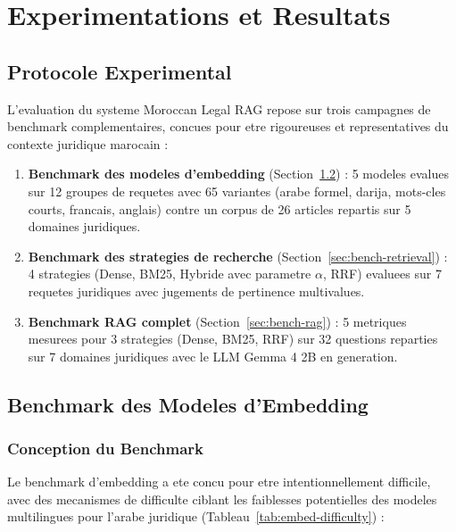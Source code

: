 \chapter{Experimentations et Resultats}
\label{chap:experimentations}

\section{Protocole Experimental}

L'evaluation du systeme Moroccan Legal RAG repose sur trois campagnes de benchmark complementaires, concues pour etre rigoureuses et representatives du contexte juridique marocain :

\begin{enumerate}
    \item \textbf{Benchmark des modeles d'embedding} (Section~\ref{sec:bench-embedding}) : 5 modeles evalues sur 12 groupes de requetes avec 65 variantes (arabe formel, darija, mots-cles courts, francais, anglais) contre un corpus de 26 articles repartis sur 5 domaines juridiques.

    \item \textbf{Benchmark des strategies de recherche} (Section~\ref{sec:bench-retrieval}) : 4 strategies (Dense, BM25, Hybride avec parametre $\alpha$, RRF) evaluees sur 7 requetes juridiques avec jugements de pertinence multivalues.

    \item \textbf{Benchmark RAG complet} (Section~\ref{sec:bench-rag}) : 5 metriques mesurees pour 3 strategies (Dense, BM25, RRF) sur 32 questions reparties sur 7 domaines juridiques avec le LLM Gemma 4 2B en generation.
\end{enumerate}

\section{Benchmark des Modeles d'Embedding}
\label{sec:bench-embedding}

\subsection{Conception du Benchmark}

Le benchmark d'embedding a ete concu pour etre intentionnellement difficile, avec des mecanismes de difficulte ciblant les faiblesses potentielles des modeles multilingues pour l'arabe juridique (Tableau~\ref{tab:embed-difficulty}) :

